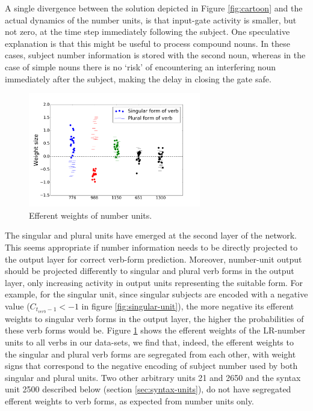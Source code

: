 A single divergence between the solution depicted in Figure \ref{fig:cartoon} and the actual dynamics of the number units, is that input-gate activity is smaller, but not zero, at the time step immediately following the subject. One speculative explanation is that this might be useful to process compound nouns. In these cases, subject number information is stored with the second noun, whereas in the case of simple nouns there is no `risk' of encountering an interfering noun immediately after the subject, making the delay in closing the gate safe.

\begin{figure}
    \centering
    \includegraphics[height=5cm]{Figures/weight_dists_verbs.png}
    \caption{Efferent weights of number units.}
    \label{fig:output-weights}
\end{figure}

The singular and plural units have emerged at the second layer of the network. This seems appropriate if number information needs to be directly projected to the output layer for correct verb-form prediction. Moreover, number-unit output should be projected differently to singular and plural verb forms in the output layer, only increasing activity in output units representing the suitable form. For example, for the singular unit, since singular subjects are encoded with a negative value ($C_{t_{verb}-1}<-1$ in figure \ref{fig:singular-unit}), the more negative its efferent weights to singular verb forms in the output layer, the higher the probabilities of these verb forms would be. Figure \ref{fig:output-weights} shows the efferent weights of the LR-number units to all verbs in our data-sets, we find that, indeed, the efferent weights to the singular and plural verb forms are segregated from each other, with weight signs that correspond to the negative encoding of subject number used by both singular and plural units. Two other arbitrary units \unit{2}{1} and \unit{2}{650} and the syntax unit \unit{2}{500} described below (section \ref{sec:syntax-units}), do not have segregated efferent weights to verb forms, as expected from number units only. 

